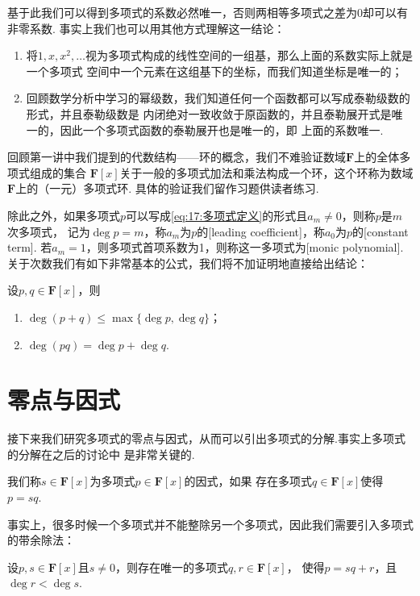 基于此我们可以得到多项式的系数必然唯一，否则两相等多项式之差为0却可以有非零系数.
事实上我们也可以用其他方式理解这一结论：
\begin{enumerate}
    \item 将$1,x,x^2,\ldots$视为多项式构成的线性空间的一组基，那么上面的系数实际上就是一个多项式
    空间中一个元素在这组基下的坐标，而我们知道坐标是唯一的；
    \item 回顾数学分析中学习的幂级数，我们知道任何一个函数都可以写成泰勒级数的形式，并且泰勒级数是
    内闭绝对一致收敛于原函数的，并且泰勒展开式是唯一的，因此一个多项式函数的泰勒展开也是唯一的，即
    上面的系数唯一.
\end{enumerate}

回顾第一讲中我们提到的代数结构——环的概念，我们不难验证数域$\mathbf{F}$上的全体多项式组成的集合
$\mathbf{F}[x]$关于一般的多项式加法和乘法构成一个环，这个环称为数域$\mathbf{F}$上的（一元）多项式环.
具体的验证我们留作习题供读者练习.

除此之外，如果多项式$p$可以写成\autoref{eq:17:多项式定义}的形式且$a_m\neq 0$，则称$p$是$m$次多项式，
记为$\deg p=m$，称$a_m$为$p$的[leading coefficient]，称$a_0$为$p$的[constant term].
若$a_m=1$，则多项式首项系数为1，则称这一多项式为[monic polynomial].
关于次数我们有如下非常基本的公式，我们将不加证明地直接给出结论：
\begin{theorem}
    设$p,q\in\mathbf{F}[x]$，则
    \begin{enumerate}
        \item $\deg(p+q)\leqslant \max\{\deg p,\deg q\}$；
        \item $\deg(pq)=\deg p+\deg q$.
    \end{enumerate}
\end{theorem}

\section{零点与因式}
接下来我们研究多项式的零点与因式，从而可以引出多项式的分解.事实上多项式的分解在之后的讨论中
是非常关键的.
\begin{definition}
    我们称$s\in\mathbf{F}[x]$为多项式$p\in\mathbf{F}[x]$的因式，如果
    存在多项式$q\in\mathbf{F}[x]$使得$p=sq$.
\end{definition}

事实上，很多时候一个多项式并不能整除另一个多项式，因此我们需要引入多项式的带余除法：
\begin{theorem}
    设$p,s\in\mathbf{F}[x]$且$s\neq 0$，则存在唯一的多项式$q,r\in\mathbf{F}[x]$，
    使得$p=sq+r$，且$\deg r<\deg s$.
\end{theorem}

